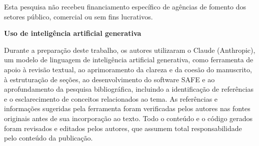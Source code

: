 \documentclass[portuguese]{sbc2025}%
\begin{document}
\begin{declarations}
\begin{funding}
Esta pesquisa não recebeu financiamento específico de agências de fomento dos setores público, comercial ou sem fins lucrativos.

\end{funding}


\begin{furtherinformation}

\textbf{Uso de inteligência artificial generativa }

Durante a preparação deste trabalho, os autores utilizaram o Claude (Anthropic), um modelo de linguagem de inteligência artificial generativa, como ferramenta de apoio à revisão textual, ao aprimoramento da clareza e da coesão do manuscrito, à estruturação de seções, ao desenvolvimento do software SAFE e ao aprofundamento da pesquisa bibliográfica, incluindo a identificação de referências e o esclarecimento de conceitos relacionados ao tema. As referências e informações sugeridas pela ferramenta foram verificadas pelos autores nas fontes originais antes de sua incorporação ao texto. Todo o conteúdo e o código gerados foram revisados e editados pelos autores, que assumem total responsabilidade pelo conteúdo da publicação.


\end{furtherinformation}

\end{declarations}





\end{document}
